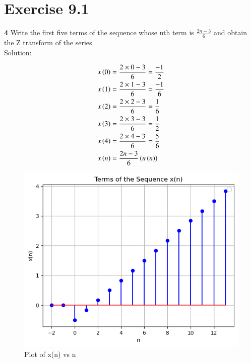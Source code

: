 \documentclass[journal,12pt,twocolumn]{IEEEtran}
\theoremstyle{remark}
\begin{document}


\vspace{3cm}

\title{}
\author{EE23BTECH11047 - Deepakreddy P
}
\maketitle
\newpage
\bigskip

\section*{Exercise 9.1}

\noindent \textbf{4} \hspace{2pt} Write the first five terms of the sequence whose nth term is $\frac{2n-3}{6}$ and obtain the Z transform of the series\\
\noindent Solution:

\begin{align}
x \left(0\right) &= \frac{2 \times 0 - 3}{6} = \frac{-1}{2}\\
x \left(1\right) &= \frac{2 \times 1 - 3}{6} = \frac{-1}{6} \\
x \left(2\right) &= \frac{2 \times 2 - 3}{6} = \frac{1}{6}\\
x \left(3\right) &= \frac{2 \times 3 - 3}{6} = \frac{1}{2} \\
x \left(4\right) &= \frac{2 \times 4 - 3}{6} = \frac{5}{6}\\
x \left(n\right) &= \frac{2n-3}{6} \left(u\left(n\right)\right)
\label{x(n)}
\end{align}

\begin{figure}[h]
   \centering
   \includegraphics[width=1\columnwidth]{figs/plot.png}
   \caption{Plot of x(n) vs n}
   \label{fig: 9.1.4.1}
\end{figure}
\end{document}
